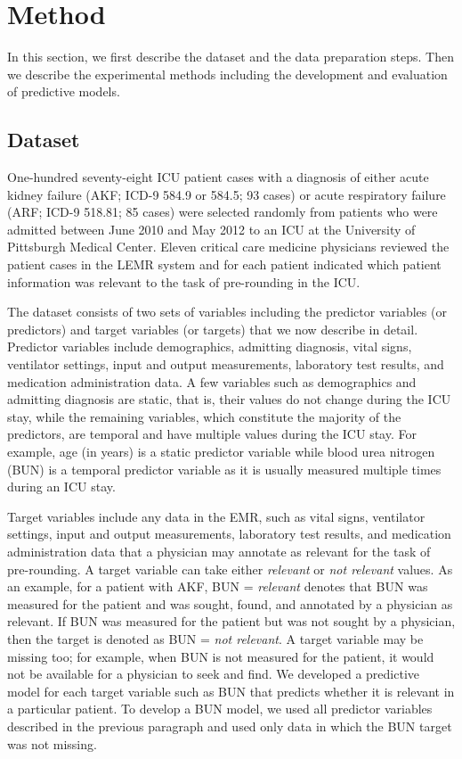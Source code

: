 \section{Method} \label{sec:method}
In this section, we first describe the dataset and the data preparation steps. Then we describe the experimental methods including the development and evaluation of predictive models.

\subsection{Dataset}\label{sec:dataset}
One-hundred seventy-eight ICU patient cases with a diagnosis of either acute kidney failure (AKF; ICD-9 584.9 or 584.5; 93 cases) or acute respiratory failure (ARF; ICD-9 518.81; 85 cases) were selected randomly from patients who were admitted between June 2010 and May 2012 to an ICU at the University of Pittsburgh Medical Center. Eleven critical care medicine physicians reviewed the patient cases in the LEMR system and for each patient indicated which patient information was relevant to the task of pre-rounding in the ICU.

The dataset consists of two sets of variables including the predictor variables (or predictors) and target variables (or targets) that we now describe in detail. Predictor variables include demographics, admitting diagnosis, vital signs, ventilator settings, input and output measurements, laboratory test results, and medication administration data. A few variables such as demographics and admitting diagnosis are static, that is, their values do not change during the ICU stay, while the remaining variables, which constitute the majority of the predictors, are temporal and have multiple values during the ICU stay. For example, age (in years) is a static predictor variable while blood urea nitrogen (BUN) is a temporal predictor variable as it is usually measured multiple times during an ICU stay.

Target variables include any data in the EMR, such as vital signs, ventilator settings, input and output measurements, laboratory test results, and medication administration data that a physician may annotate as relevant for the task of pre-rounding. A target variable can take either \textit{relevant} or \textit{not relevant} values. As an example, for a patient with AKF, BUN = \textit{relevant} denotes that BUN was measured for the patient and was sought, found, and annotated by a physician as relevant. If BUN was measured for the patient but was not sought by a physician, then the target is denoted as BUN = \textit{not relevant}. A target variable may be missing too; for example, when BUN is not measured for the patient, it would not be available for a physician to seek and find. We developed a predictive model for each target variable such as BUN that predicts whether it is relevant in a particular patient. To develop a BUN model, we used all predictor variables described in the previous paragraph and used only data in which the BUN target was not missing. 


